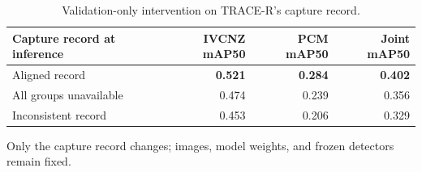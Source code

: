 \begin{table}[!t]
\centering
\caption{Validation-only intervention on TRACE-R's capture record.}
\label{tab:metadata_controls}
\scriptsize
\begin{tabular}{lrrr}
\toprule
Capture record at inference & IVCNZ mAP50 & PCM mAP50 & Joint mAP50 \\
\midrule
Aligned record & \textbf{0.521} & \textbf{0.284} & \textbf{0.402} \\
All groups unavailable & 0.474 & 0.239 & 0.356 \\
Inconsistent record & 0.453 & 0.206 & 0.329 \\
\bottomrule
\end{tabular}
\vspace{1mm}
\parbox{0.97\columnwidth}{\scriptsize Only the capture record changes; images, model weights, and frozen detectors remain fixed.}
\end{table}
